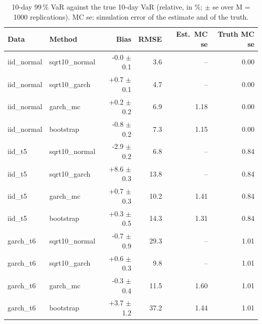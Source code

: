 \begin{table}[H]
\centering
\small
\caption{10-day 99\,\% VaR against the true 10-day VaR (relative, in \%; $\pm$ se over M = 1000 replications). MC se: simulation error of the estimate and of the truth.}
\label{tab:T5_horizon}
\begin{tabular}{llrrrr}
\toprule
Data & Method & Bias & RMSE & Est.\ MC se & Truth MC se \\
\midrule
iid\_normal & sqrt10\_normal & -0.0 $\pm$ 0.1 & 3.6 & -- & 0.00 \\
iid\_normal & sqrt10\_garch & +0.7 $\pm$ 0.1 & 4.7 & -- & 0.00 \\
iid\_normal & garch\_mc & +0.2 $\pm$ 0.2 & 6.9 & 1.18 & 0.00 \\
iid\_normal & bootstrap & -0.8 $\pm$ 0.2 & 7.3 & 1.15 & 0.00 \\
iid\_t5 & sqrt10\_normal & -2.9 $\pm$ 0.2 & 6.8 & -- & 0.84 \\
iid\_t5 & sqrt10\_garch & +8.6 $\pm$ 0.3 & 13.8 & -- & 0.84 \\
iid\_t5 & garch\_mc & +0.7 $\pm$ 0.3 & 10.2 & 1.41 & 0.84 \\
iid\_t5 & bootstrap & +0.3 $\pm$ 0.5 & 14.3 & 1.31 & 0.84 \\
garch\_t6 & sqrt10\_normal & -0.7 $\pm$ 0.9 & 29.3 & -- & 1.01 \\
garch\_t6 & sqrt10\_garch & +0.6 $\pm$ 0.3 & 9.8 & -- & 1.01 \\
garch\_t6 & garch\_mc & -0.3 $\pm$ 0.4 & 11.5 & 1.60 & 1.01 \\
garch\_t6 & bootstrap & +3.7 $\pm$ 1.2 & 37.2 & 1.44 & 1.01 \\
\bottomrule
\end{tabular}
\end{table}
